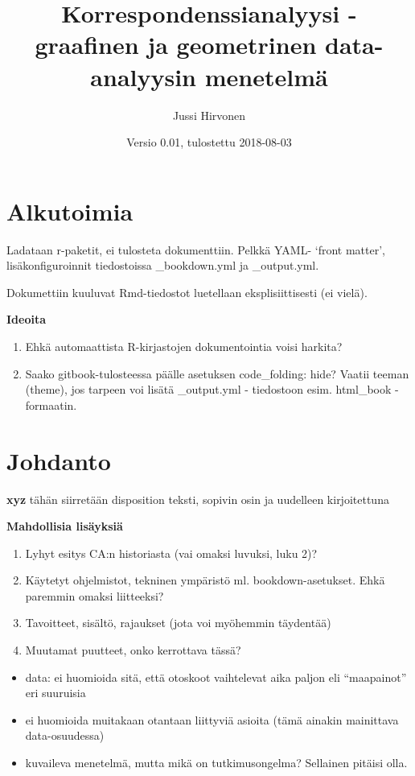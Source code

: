\documentclass[finnish,]{book}
\title{Korrespondenssianalyysi - graafinen ja geometrinen data-analyysin
menetelmä}
\author{Jussi Hirvonen}
\date{Versio 0.01, tulostettu 2018-08-03}
\begin{document}
\maketitle

{
\setcounter{tocdepth}{1}
\tableofcontents
}
\hypertarget{alkutoimia}{%
\chapter*{Alkutoimia}\label{alkutoimia}}

Ladataan r-paketit, ei tulosteta dokumenttiin. Pelkkä YAML- `front
matter', lisäkonfiguroinnit tiedostoissa \_bookdown.yml ja \_output.yml.

Dokumettiin kuuluvat Rmd-tiedostot luetellaan eksplisiittisesti (ei
vielä).

\textbf{Ideoita}

\begin{enumerate}
\def\labelenumi{\arabic{enumi}.}
\item
  Ehkä automaattista R-kirjastojen dokumentointia voisi harkita?
\item
  Saako gitbook-tulosteessa päälle asetuksen code\_folding: hide? Vaatii
  teeman (theme), jos tarpeen voi lisätä \_output.yml - tiedostoon esim.
  html\_book - formaatin.
\end{enumerate}

\hypertarget{johdanto}{%
\chapter{Johdanto}\label{johdanto}}

\textbf{xyz} tähän siirretään disposition teksti, sopivin osin ja
uudelleen kirjoitettuna

\textbf{Mahdollisia lisäyksiä}

\begin{enumerate}
\def\labelenumi{\arabic{enumi}.}
\item
  Lyhyt esitys CA:n historiasta (vai omaksi luvuksi, luku 2)?
\item
  Käytetyt ohjelmistot, tekninen ympäristö ml. bookdown-asetukset. Ehkä
  paremmin omaksi liitteeksi?
\item
  Tavoitteet, sisältö, rajaukset (jota voi myöhemmin täydentää)
\item
  Muutamat puutteet, onko kerrottava tässä?
\end{enumerate}

\begin{itemize}
\item
  data: ei huomioida sitä, että otoskoot vaihtelevat aika paljon eli
  ``maapainot'' eri suuruisia
\item
  ei huomioida muitakaan otantaan liittyviä asioita (tämä ainakin
  mainittava data-osuudessa)
\item
  kuvaileva menetelmä, mutta mikä on tutkimusongelma? Sellainen pitäisi
  olla.
\end{itemize}
\end{document}
